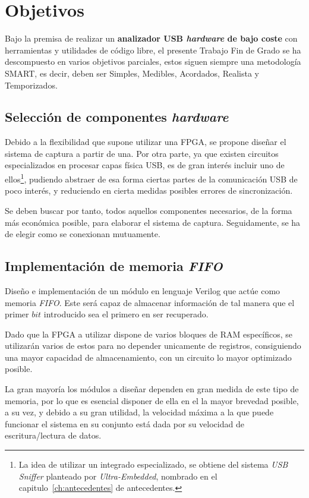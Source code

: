 \chapter{Objetivos}
\label{ch:objetivos}

Bajo la premisa de realizar un \textbf{analizador USB \emph{hardware} de bajo coste} con herramientas y utilidades de código libre, el presente Trabajo Fin de Grado se ha descompuesto en varios objetivos parciales, estos siguen siempre una metodología SMART, es decir, deben ser Simples, Medibles, Acordados, Realista y Temporizados.

\section{Selección de componentes \emph{hardware}}
Debido a la flexibilidad que supone utilizar una FPGA\cite{monmasson2007fpga}, se propone diseñar el sistema de captura a partir de una. Por otra parte, ya que existen circuitos especializados en procesar capas física USB, es de gran interés incluir uno de ellos\footnote{La idea de utilizar un integrado especializado, se obtiene del sistema \emph{USB Sniffer} planteado por \emph{Ultra-Embedded}, nombrado en el capitulo~\ref{ch:antecedentes} de antecedentes.}, pudiendo abstraer de esa forma ciertas partes de la comunicación USB de poco interés, y reduciendo en cierta medidas posibles errores de sincronización.

Se deben buscar por tanto, todos aquellos componentes necesarios, de la forma más económica posible, para elaborar el sistema de captura. Seguidamente, se ha de elegir como se conexionan mutuamente.

\section{Implementación de memoria \emph{FIFO}}
Diseño e implementación de un módulo en lenguaje Verilog que actúe como memoria \emph{FIFO}. Este será capaz de almacenar información de tal manera que el primer $bit$ introducido sea el primero en ser recuperado.

Dado que la FPGA a utilizar dispone de varios bloques de RAM específicos, se utilizarán varios de estos para no depender unicamente de registros, consiguiendo una mayor capacidad de almacenamiento, con un circuito lo mayor optimizado posible.

La gran mayoría los módulos a diseñar dependen en gran medida de este tipo de memoria, por lo que es esencial disponer de ella en el la mayor brevedad posible, a su vez, y debido a su gran utilidad, la velocidad\cite{rose1993architecture} máxima a la que puede funcionar el sistema en su conjunto está dada por su velocidad de escritura/lectura de datos.

